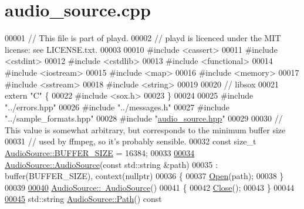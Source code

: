 \hypertarget{audio__source_8cpp_source}{\section{audio\+\_\+source.\+cpp}
\label{audio__source_8cpp_source}
}

\begin{DoxyCode}
00001 \textcolor{comment}{// This file is part of playd.}
00002 \textcolor{comment}{// playd is licenced under the MIT license: see LICENSE.txt.}
00003 
00010 \textcolor{preprocessor}{#include <cassert>}
00011 \textcolor{preprocessor}{#include <cstdint>}
00012 \textcolor{preprocessor}{#include <cstdlib>}
00013 \textcolor{preprocessor}{#include <functional>}
00014 \textcolor{preprocessor}{#include <iostream>}
00015 \textcolor{preprocessor}{#include <map>}
00016 \textcolor{preprocessor}{#include <memory>}
00017 \textcolor{preprocessor}{#include <sstream>}
00018 \textcolor{preprocessor}{#include <string>}
00019 
00020 \textcolor{comment}{// libsox}
00021 \textcolor{keyword}{extern} \textcolor{stringliteral}{"C"} \{
00022 \textcolor{preprocessor}{#include <sox.h>}
00023 \}
00024 
00025 \textcolor{preprocessor}{#include "../errors.hpp"}
00026 \textcolor{preprocessor}{#include "../messages.h"}
00027 \textcolor{preprocessor}{#include "../sample\_formats.hpp"}
00028 \textcolor{preprocessor}{#include "\hyperlink{audio__source_8hpp}{audio\_source.hpp}"}
00029 
00030 \textcolor{comment}{// This value is somewhat arbitrary, but corresponds to the minimum buffer size}
00031 \textcolor{comment}{// used by ffmpeg, so it's probably sensible.}
00032 \textcolor{keyword}{const} \textcolor{keywordtype}{size\_t} \hyperlink{classAudioSource_a9c269c8d9c633bcd11d596c1ba3fd575}{AudioSource::BUFFER\_SIZE} = 16384;
00033 
\hypertarget{audio__source_8cpp_source_l00034}{}\hyperlink{classAudioSource_abcb925739a649c30663385a15d83af26}{00034} \hyperlink{classAudioSource_abcb925739a649c30663385a15d83af26}{AudioSource::AudioSource}(\textcolor{keyword}{const} std::string &path)
00035     : buffer(BUFFER\_SIZE), context(nullptr)
00036 \{
00037     \hyperlink{classAudioSource_a9b10234d7c9f29b17008b4dc3eab2a71}{Open}(path);
00038 \}
00039 
\hypertarget{audio__source_8cpp_source_l00040}{}\hyperlink{classAudioSource_a4d4b2be34ec676bf01d1ca1784f79a07}{00040} \hyperlink{classAudioSource_a4d4b2be34ec676bf01d1ca1784f79a07}{AudioSource::~AudioSource}()
00041 \{
00042     \hyperlink{classAudioSource_a46444de950d02ac35a695ad167fed2f4}{Close}();
00043 \}
00044 
\hypertarget{audio__source_8cpp_source_l00045}{}\hyperlink{classAudioSource_aea5c3828f1b22a9e103a5d56f9ffa5ec}{00045} std::string \hyperlink{classAudioSource_aea5c3828f1b22a9e103a5d56f9ffa5ec}{AudioSource::Path}()\textcolor{keyword}{ const}

\end{DoxyCode}

